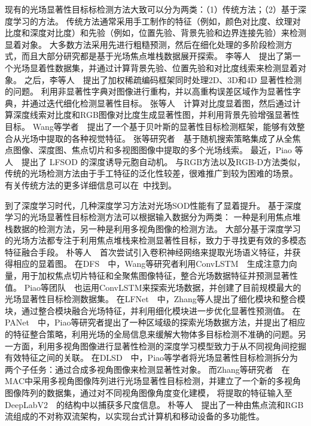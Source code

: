 现有的光场显著性目标标检测方法大致可以分为两类：（1）传统方法；（2）基于深度学习的方法。 传统方法通常采用手工制作的特征（例如，颜色对比度、纹理对比度和深度对比度）和先验（例如，位置先验、背景先验和边界连接先验）来检测显着对象。 
大多数方法采用先进行粗糙预测，然后在细化处理的多阶段检测方式，而且大部分研究都是基于光场焦点堆栈数据展开探索。
%
%
李等人~\cite{li2014saliency}~提出了第一个光场显着性数据集，并通过计算背景先验、位置先验和对比度线索来检测显着对象。
之后，李等人~\cite{li2015weighted}~提出了加权稀疏编码框架同时处理2D、3D和4D 显著性检测的问题。
利用非显著性字典对图像进行重构，并以高重构误差区域作为显著性字典，并通过迭代细化检测显著性目标。
张等人~\cite{zhang2015saliency}~计算对比度显着图，然后通过计算深度线索对比度和RGB图像对比度生成显著性图，并利用背景先验增强显著性目标。
Wang等学者~\cite{wang2017two}~提出了一个基于贝叶斯的显著性目标检测框架，能够有效整合从光场中提取的各种视觉特征。
张等研究者~\cite{zhang2017saliency}~基于随机搜索策略集成了从全焦点图像、深度图、焦点切片和多视图图像中提取的多个光场线索。 
最近，Piao 等人~\cite{piao2019saliency}~提出了 LFSOD 的深度诱导元胞自动机。
与RGB方法以及RGB-D方法类似，传统的光场检测方法由于手工特征的泛化性较差，很难推广到较为困难的场景。
有关传统方法的更多详细信息可以在\cite{fu2022light}~中找到。



到了深度学习时代，几种深度学习方法对光场SOD性能有了显着提升。 
基于深度学习的光场显著性目标检测方法可以根据输入数据分为两类：
一种是利用焦点堆栈数据的检测方法，另一种是利用多视角图像的检测方法。
大部分基于深度学习的光场方法都专注于利用焦点堆栈来检测显著性目标，致力于寻找更有效的多模态特征融合手段。
朴等人~\cite{piao2019deep}~首次尝试引入卷积神经网络来提取光场语义特征，并获得相应的显着图。 
在DFS~\cite{wang2019deep}~中，Wang等研究者利用ConvLSTM~\cite{chen2015convolutional}~生成注意力向量，用于加权焦点切片特征和全聚焦图像特征，整合光场数据特征并预测显著性值。
Piao等团队~\cite{zhang2019memory}~也运用ConvLSTM来探索光场数据，并创建了目前规模最大的光场显著性目标检测数据集。
在LFNet~\cite{zhang2020lfnet}~中，Zhang等人提出了细化模块和整合模块，通过整合模块融合光场特征，并利用细化模块进一步优化显著性预测值。
在PANet~\cite{piao2021panet}~中，Piao等研究者提出了一种区域级的探索光场数据方法，并提出了相应的特征整合策略，利用光场的全局信息来缓解大物体多目标检测不准确的问题。另一方面，利用多视角图像进行显著性检测的深度学习模型致力于从不同视角间挖掘有效特征之间的关联。
在DLSD~\cite{piao2019deep}~中，Piao等学者将光场显著性目标检测拆分为两个子任务：通过合成多视角图像来检测显著性对象。
而Zhang等研究者~\cite{zhang2020light}~在MAC中采用多视角图像阵列进行光场显著性目标检测，并建立了一个新的多视角图像阵列的数据集，通过对不同视角图像角度变化建模，
将提取的特征输入至DeepLabV2~\cite{chen2017deeplab}~的结构中以捕获多尺度信息。
朴等人~\cite{piao2020exploit}~提出了一种由焦点流和RGB流组成的不对称双流架构，以实现台式计算机和移动设备的多功能性。



